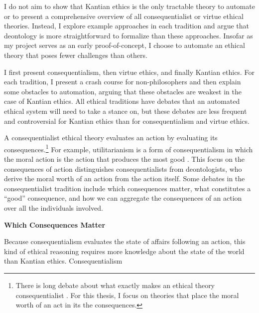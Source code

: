 \begin{isabellebody}
\begin{isamarkuptext}
I do not aim to show that Kantian ethics is the only tractable theory to automate or
to present a comprehensive overview of all consequentialist or virtue ethical theories. Instead, I 
explore example approaches in each tradition and argue that deontology is more straightforward 
to formalize than these approaches. Insofar as my project serves 
as an early proof-of-concept, I choose to automate an ethical theory that 
poses fewer challenges than others. 

I first present consequentialism, then virtue ethics, and finally Kantian ethics. For each 
tradition, I present a crash course for non-philosophers and then explain some obstacles to automation, 
arguing that these obstacles are weakest in the case of Kantian ethics. All ethical traditions have debates that an 
automated ethical system will need to take a stance on, but these debates are less frequent and controversial
for Kantian ethics than for consequentialism and virtue ethics.%
\end{isamarkuptext}\isamarkuptrue%
%
\isadelimdocument
%
\endisadelimdocument
%
\isatagdocument
%
\isamarkuptrue%
%
\endisatagdocument
{\isafolddocument}%
%
\isadelimdocument
%
\endisadelimdocument
%
\begin{isamarkuptext}%
A consequentialist ethical theory evaluates an 
action by evaluating its consequences.\footnote{There is long debate about what exactly makes an ethical theory consequentialist \citep{consequentialismsep}. 
For this thesis, I focus on theories that place the moral worth of an act in its the consequences.} For example, 
utilitarianism is a form of consequentialism in which the moral action 
is the action that produces the most good \citep{utilsep}. This focus
on the consequences of action distinguishes consequentialists from deontologists, who derive the moral worth
of an action from the action itself. Some debates in the consequentialist tradition include 
which consequences matter, what constitutes a ``good'' consequence, and how we can 
aggregate the consequences of an action over all the individuals involved.%
\end{isamarkuptext}\isamarkuptrue%
%
\begin{isamarkuptext}%
\noindent \textbf{Which Consequences Matter}%
\end{isamarkuptext}\isamarkuptrue%
%
\begin{isamarkuptext}%
Because consequentialism evaluates the state of affairs following an action, this kind of ethical 
reasoning requires more knowledge about the state of the world than Kantian ethics. Consequentialism

\end{isamarkuptext}
\end{isabellebody}
